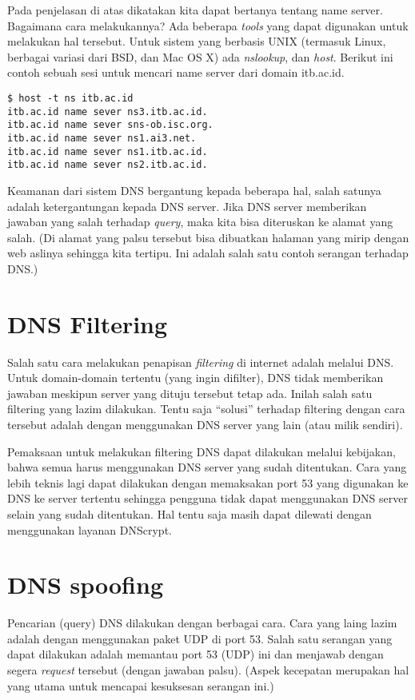 Pada penjelasan di atas dikatakan kita dapat bertanya tentang name server.
Bagaimana cara melakukannya? Ada beberapa {\em tools} yang dapat digunakan
untuk melakukan hal tersebut. Untuk sistem yang berbasis UNIX (termasuk Linux,
berbagai variasi dari BSD, dan Mac OS X) ada {\em nslookup}, dan {\em host}.
Berikut ini contoh sebuah sesi untuk mencari name server dari domain itb.ac.id.

\begin{verbatim}
$ host -t ns itb.ac.id
itb.ac.id name sever ns3.itb.ac.id.
itb.ac.id name sever sns-ob.isc.org.
itb.ac.id name sever ns1.ai3.net.
itb.ac.id name sever ns1.itb.ac.id.
itb.ac.id name sever ns2.itb.ac.id.
\end{verbatim}

Keamanan dari sistem DNS bergantung kepada beberapa hal, salah satunya adalah
ketergantungan kepada DNS server. Jika DNS server memberikan jawaban yang salah
terhadap {\em query}, maka kita bisa diteruskan ke alamat yang salah. (Di
alamat yang palsu tersebut bisa dibuatkan halaman yang mirip dengan web aslinya
sehingga kita tertipu. Ini adalah salah satu contoh serangan terhadap DNS.)


\section{DNS Filtering}
Salah satu cara melakukan penapisan {\em filtering} di internet adalah melalui
DNS. Untuk domain-domain tertentu (yang ingin difilter), DNS tidak memberikan
jawaban meskipun server yang dituju tersebut tetap ada. Inilah salah satu
filtering yang lazim dilakukan.
Tentu saja ``solusi'' terhadap filtering dengan cara tersebut adalah dengan 
menggunakan DNS server yang lain (atau milik sendiri).

Pemaksaan untuk melakukan filtering DNS dapat dilakukan melalui kebijakan,
bahwa semua harus menggunakan DNS server yang sudah ditentukan. Cara yang lebih
teknis lagi dapat dilakukan dengan memaksakan port 53 yang digunakan ke DNS ke
server tertentu sehingga pengguna tidak dapat menggunakan DNS server selain
yang sudah ditentukan. Hal tentu saja masih dapat dilewati dengan menggunakan
layanan DNScrypt.


\section{DNS spoofing}
Pencarian (query) DNS dilakukan dengan berbagai cara. Cara yang laing lazim
adalah dengan menggunakan paket UDP di port 53. Salah satu serangan yang dapat
dilakukan adalah memantau port 53 (UDP) ini dan menjawab dengan segera {\em
request} tersebut (dengan jawaban palsu). (Aspek kecepatan merupakan hal yang
utama untuk mencapai kesuksesan serangan ini.)

